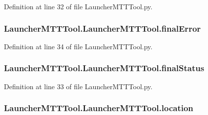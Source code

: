 Definition at line 32 of file Launcher\-M\-T\-T\-Tool.\-py.

\hypertarget{class_launcher_m_t_t_tool_1_1_launcher_m_t_t_tool_a607ea8851059a23f64f5b1ef4590109e}{
\subsubsection[{final\-Error}]{\setlength{\rightskip}{0pt plus 5cm}Launcher\-M\-T\-T\-Tool.\-Launcher\-M\-T\-T\-Tool.\-final\-Error}}\label{class_launcher_m_t_t_tool_1_1_launcher_m_t_t_tool_a607ea8851059a23f64f5b1ef4590109e}


Definition at line 34 of file Launcher\-M\-T\-T\-Tool.\-py.

\hypertarget{class_launcher_m_t_t_tool_1_1_launcher_m_t_t_tool_a24a3038f22807231f60be1efd39f7bcb}{
\subsubsection[{final\-Status}]{\setlength{\rightskip}{0pt plus 5cm}Launcher\-M\-T\-T\-Tool.\-Launcher\-M\-T\-T\-Tool.\-final\-Status}}\label{class_launcher_m_t_t_tool_1_1_launcher_m_t_t_tool_a24a3038f22807231f60be1efd39f7bcb}


Definition at line 33 of file Launcher\-M\-T\-T\-Tool.\-py.

\hypertarget{class_launcher_m_t_t_tool_1_1_launcher_m_t_t_tool_a13b93dfdaa7c433967c808d9bf54dcf9}{
\subsubsection[{location}]{\setlength{\rightskip}{0pt plus 5cm}Launcher\-M\-T\-T\-Tool.\-Launcher\-M\-T\-T\-Tool.\-location}}\label{class_launcher_m_t_t_tool_1_1_launcher_m_t_t_tool_a13b93dfdaa7c433967c808d9bf54dcf9}


